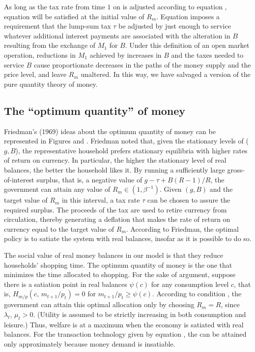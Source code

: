    As long as the tax rate from time $1$ on is adjusted
according to equation , equation  will be
satisfied at the initial value of $R_m$.  Equation 
imposes a requirement that the lump-sum tax $\tau$ be adjusted by
just enough to  service whatever additional interest payments are
associated with the alteration in $B$ resulting from the exchange
of $M_1$ for $B$. Under this definition
of an open market operation, reductions in $M_1$ achieved by
increases in $B$ and the taxes needed to service $B$ cause
proportionate decreases in the paths of the money supply and the
price level, and leave $R_m$ unaltered. In this way, we have salvaged a
version of
the pure quantity theory of money.
\subsection{The ``optimum quantity'' of money}
Friedman's (1969) ideas about the optimum quantity of money can
be represented in Figures  and . %
Friedman noted that, given the stationary levels
of ($g,B$), the representative household prefers
stationary equilibria with higher rates of return on currency.
In particular, the higher the stationary level of real
balances, the better the household likes it.  By running
a sufficiently large gross-of-interest surplus, that is, a
negative value of  $g - \tau + B(R-1)/R$,
the government can attain any  value
 of $R_m \in (1,\beta^{-1})$.  Given $(g,B)$ and the target
value of $R_m$ in this interval, a tax rate $\tau$ can
be chosen to assure the required surplus.  The proceeds of the
tax are used to retire currency from circulation, thereby
generating a deflation that  makes the rate of return on
currency equal to the target value of  $R_m$.  According to Friedman, the optimal
policy is to satiate the system with real balances, insofar
as it is possible to do so.


The social value of real money balances in our model is that
they reduce households' shopping time. The optimum quantity
of money is the one that minimizes the time allocated to
shopping. For the sake of argument, suppose there is
a satiation point in real balances $\psi(c)$ for any consumption
level $c$, that is, $H_{m/p}(c,\, m_{t+1}/p_t)=0$ for
$m_{t+1}/p_t \geq \psi(c)$.
According to condition , the government can
attain this optimal allocation only by choosing $R_m=R$, since
$\lambda_t, \, \mu_t >0$. (Utility is assumed to be strictly
increasing in both consumption and leisure.) Thus, welfare
is at a maximum when the economy is satiated with real balances.
For the transaction technology given by equation ,
the  can  be attained only approximately
because money demand is insatiable.


